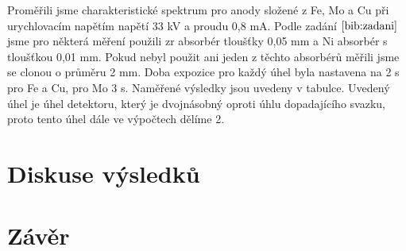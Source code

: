 Proměřili jsme charakteristické spektrum pro anody složené z Fe, Mo a Cu při urychlovacím napětím napětí 33 kV a proudu 0,8 mA. Podle zadání $\cite{bib:zadani}$ jsme pro některá měření použili zr absorbér tloušťky 0,05 mm a Ni absorbér s tloušťkou 0,01 mm. Pokud nebyl použit ani jeden z těchto absorbérů měřili jsme se clonou o průměru 2 mm. Doba expozice pro každý úhel byla nastavena na 2 s pro Fe a Cu, pro Mo 3 s. Naměřené výsledky jsou uvedeny v tabulce. Uvedený úhel je úhel detektoru, který je dvojnásobný oproti úhlu dopadajícího svazku, proto tento úhel dále ve výpočtech dělíme 2.



    
\section{Diskuse výsledků}

\section{Závěr}
